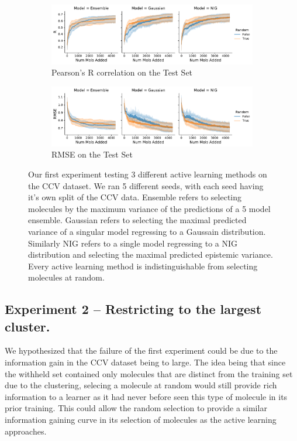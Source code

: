 \documentclass[journal=jmcmar,manuscript=article]{achemso}
\begin{document}
\begin{figure}[tbph]
    \centering
    \begin{subfigure}[b]{0.48\textwidth}
        \includegraphics[width=1\linewidth]{figures/fig2_initial_results_R.pdf}
        \caption{Pearson's R correlation on the Test Set}
    \end{subfigure}%
    \hfill
    \begin{subfigure}[b]{0.48\textwidth}
        \includegraphics[width=1\linewidth]{figures/fig2_initial_results_RMSE.pdf}
        \caption{RMSE on the Test Set}
    \end{subfigure}
    \caption{Our first experiment testing 3 different active learning methods on the CCV dataset. We ran 5 different seeds, with each seed having it's own split of the CCV data. Ensemble refers to selecting molecules by the maximum variance of the predictions of a 5 model ensemble. Gaussian refers to selecting the maximal predicted variance of a singular model regressing to a Gaussain distribution. Similarly NIG refers to a single model regressing to a NIG distribution and selecting the maximal predicted epistemic variance. Every active learning method is indistinguishable from selecting molecules at random.}
    \label{fig:initialresults}
\end{figure}

\subsection{Experiment 2 -- Restricting to the largest cluster.}
We hypothesized that the failure of the first experiment could be due to the information gain in the CCV dataset being to large. The idea being that since the withheld set contained only molecules that are distinct from the training set due to the clustering, selecing a molecule at random would still provide rich information to a learner as it had never before seen this type of molecule in its prior training. This could allow the random selection to provide a similar information gaining curve in its selection of molecules as the active learning approaches.
\end{document}
